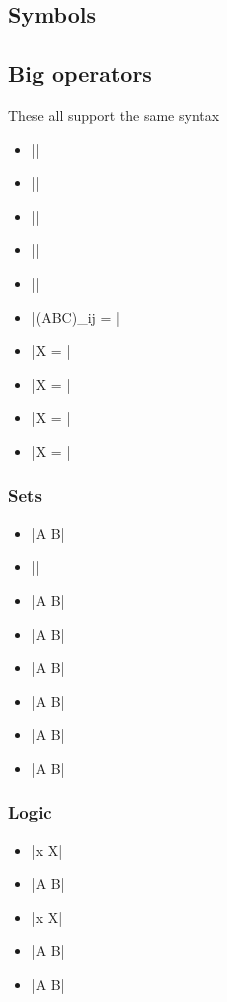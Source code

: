 \subsection{Symbols}

\subsection{Big operators}
These all support the same syntax
\begin{itemize}
  \item \Example||
  \item \Example||
  \item \Example||
  \item \Example||
  \item \Example||
  \item \Example|{(ABC)}_{ij} = |
  \item \Example|X = |
  \item \Example|X = |
  \item \Example|X = |
  \item \Example|X = |
\end{itemize}

\subsubsection{Sets}

\begin{itemize}
  \item \Example|A \setminus B|
  \item \Example|\emptyset|
  \item \Example|A \subset B|
  \item \Example|A \supset B|
  \item \Example|A \subseteq B|
  \item \Example|A \intersection B|
  \item \Example|A \union B|
  \item \Example|A \in B|
\end{itemize}


\subsubsection{Logic}

\begin{itemize}
  \item \Example|\exists x \in X|
  \item \Example|A \iff B|
  \item \Example|\forall x \in X|
  \item \Example|A \implies B|
  \item \Example|A \implies \neg B|
\end{itemize}

